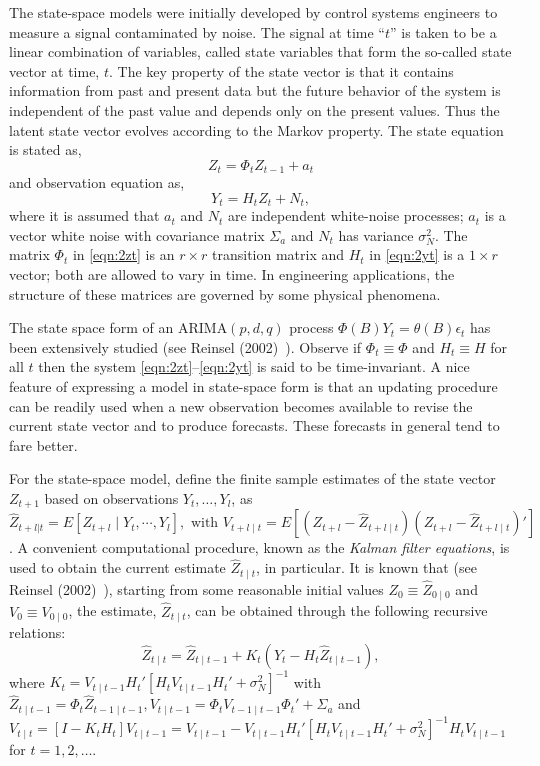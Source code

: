 The state-space models were initially developed by control systems engineers to measure a signal contaminated by noise. The signal at time ``$t$'' is taken to be a linear combination of variables, called state variables that form the so-called state vector at time, $t$. The key property of the state vector is that it contains information from past and present data but the future behavior of the system is independent of the past value and depends only on the present values. Thus the latent state vector evolves according to the Markov property. The state equation is stated as,
	\begin{equation} \label{eqn:2zt}
	Z_t = \Phi_tZ_{t-1} + a_t
	\end{equation}
and observation equation as,
	\begin{equation} \label{eqn:2yt}
	Y_t = H_tZ_t + N_t,
	\end{equation}
where it is assumed that $a_t$ and $N_t$ are independent white-noise processes; $a_t$ is a vector white noise with covariance matrix $\Sigma_a$ and $N_t$ has variance $\sigma_N^2$. The matrix $\Phi_t$ in \eqref{eqn:2zt} is an $r \times r$ transition matrix and $H_t$ in \eqref{eqn:2yt} is a $1 \times r$ vector; both are allowed to vary in time. In engineering applications, the structure of these matrices are governed by some physical phenomena. 


The state space form of an ARIMA$(p,d,q)$ process $\Phi(B)Y_t= \theta(B)\epsilon_t$ has been extensively studied (see Reinsel (2002)~\cite[Section~2.6]{2002reinsel}). Observe if $\Phi_t \equiv \Phi$ and $H_t \equiv H$ for all $t$ then the system \eqref{eqn:2zt}--\eqref{eqn:2yt} is said to be time-invariant. A nice feature of expressing a model in state-space form is that an updating procedure can be readily used when a new observation becomes available to revise the current state vector and to produce forecasts. These forecasts in general tend to fare better. 


For the state-space model, define the finite sample estimates of the state vector $Z_{t+1}$ based on observations $Y_t, \ldots, Y_l$, as $\hat{Z}_{t+l|t} = E[Z_{t+l} \;|\; Y_t,\cdots,Y_l],\text{ with } V_{t+l \;|\; t} = E[(Z_{t+l} - \hat{Z}_{t+l \;|\; t})(Z_{t+l} - \hat{Z}_{t+l \;|\; t})']$. A convenient computational procedure, known as the \emph{Kalman filter equations}, is used to obtain the current estimate $\hat{Z}_{t\;|\;t}$, in particular. It is known that (see Reinsel (2002)~\cite{2002reinsel}), starting from some reasonable initial values $Z_0 \equiv \hat{Z}_{0 \;|\; 0}$ and $V_0 \equiv V_{0\;|\;0}$, the estimate, $\hat{Z}_{t \;|\; t}$, can be obtained through the following recursive relations:
	\begin{equation}\label{eqn:2hatz}
	\hat{Z}_{t \;|\; t} = \hat{Z}_{t \;|\; t-1} + K_t(Y_t - H_t \hat{Z}_{t \;|\; t-1}),
	\end{equation}
where $K_t= V_{t \;|\; t-1} H_t'[H_t V_{t \;|\; t-1} H_t' + \sigma_N^2]^{-1}$ with $\hat{Z}_{t \;|\; t-1} = \Phi_t \hat{Z}_{t-1\;|\; t-1},V_{t \;|\; t-1} = \Phi_t V_{t-1\;|\; t-1} \Phi_t' + \Sigma_{a}$ and $V_{t \;|\; t} = [I - K_t H_t] V_{t \;|\; t-1} = V_{t\;|\; t-1} - V_{t\;|\; t-1} H_t' [H_t V_{t \;|\; t-1} H_t' + \sigma_N^2]^{-1} H_t V_{t \;|\; t-1}$ for $t= 1,2, \ldots$.


